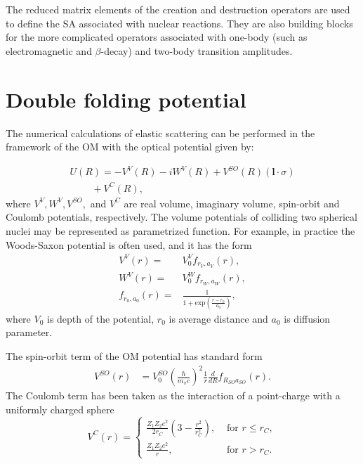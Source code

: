 \documentclass[
12pt, %
oneside, %
english, %
doublespacing, %
doublespacing, %
toctotoc, %
parskip, %
headsepline, %
]{MastersDoctoralThesis} %
\begin{document}
The reduced matrix elements of the creation and destruction operators
are used to define the SA associated with nuclear reactions.
They are also building blocks for the more complicated operators associated with
one-body (such as electromagnetic and $\beta$-decay) and two-body transition amplitudes.

\section{Double folding potential}

The numerical calculations  of elastic scattering  can be performed in the framework of the OM with the optical potential given by:

\begin{equation}\label{eqn:OP}
\begin{array}{l}
 U(R)=-V^{V}(R)-iW^{V}(R)+V^{SO}(R)( \mathbf{l} \cdot \sigma )\\
~~~ ~~~~~~~+V^C(R),
\end{array}
\end{equation}
where $V^{V}, W^{V}, V^{SO},$ and $V^C$ are real volume,  imaginary volume, spin-orbit and Coulomb potentials, respectively. The volume potentials of colliding two spherical nuclei may be represented as parametrized function. For example, in practice the Woods-Saxon potential is often used, and it has the form
\begin{align}
V^V\left( r \right) = & V_0^V f_{r_V, a_V} \left( r \right), \nonumber \\
W^V\left( r \right) = & V_0^W f_{r_W, a_W} \left( r \right), \nonumber \\
f_{r_0, a_0} \left( r \right) = &  \frac{1}{1+ \text{exp} \left( \frac{r-r_0}{a_0} \right) },
\end{align}
where $V_0$ is depth of the potential, $r_0$ is  average distance and $a_0$ is  diffusion parameter. 

The spin-orbit term of the OM potential has standard form
\begin{eqnarray}
V^{SO}(r) &= V_0^{SO}\left(\frac{\hbar}{m_\pi c}\right)^2 \frac{1}{r} \frac{d}{dR} f_{R_{SO} a_{SO}}(r).
\end{eqnarray}
The Coulomb term has been taken as the interaction of a point-charge with a uniformly charged sphere
\[
\label{coul}
V^C(r)=
\begin{cases}
\frac{Z_1 Z_2 e^2}{2 r_C} \left( 3- \frac{r^2}{r_C^2} \right), &\text{  for } r \leq r_C, \\
\frac{Z_1 Z_2 e^2}{r}, & \text{ for } r > r_C .
\end{cases}
\]
\end{document}
